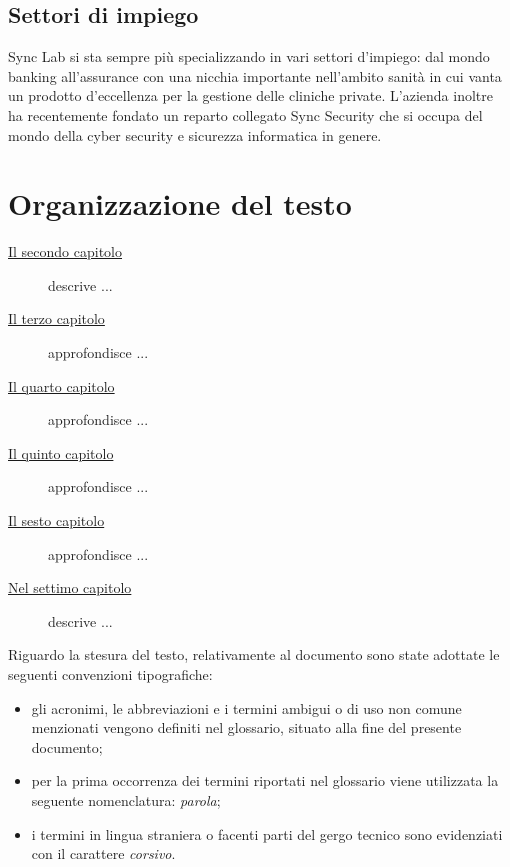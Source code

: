 \subsection{Settori di impiego}
Sync Lab si sta sempre più specializzando in vari settori d’impiego: dal mondo banking
all’assurance con una nicchia importante nell’ambito sanità in cui vanta un prodotto d’eccellenza
per la gestione delle cliniche private. L’azienda inoltre ha recentemente fondato un
reparto collegato Sync Security che si occupa del mondo della cyber security e
sicurezza informatica in genere.

\section{Organizzazione del testo}

\begin{description}
    \item[{\hyperref[cap:processi-metodologie]{Il secondo capitolo}}] descrive ...
    
    \item[{\hyperref[cap:descrizione-stage]{Il terzo capitolo}}] approfondisce ...
    
    \item[{\hyperref[cap:analisi-requisiti]{Il quarto capitolo}}] approfondisce ...
    
    \item[{\hyperref[cap:progettazione-codifica]{Il quinto capitolo}}] approfondisce ...
    
    \item[{\hyperref[cap:verifica-validazione]{Il sesto capitolo}}] approfondisce ...
    
    \item[{\hyperref[cap:conclusioni]{Nel settimo capitolo}}] descrive ...
\end{description}

Riguardo la stesura del testo, relativamente al documento sono state adottate le seguenti convenzioni tipografiche:
\begin{itemize}
	\item gli acronimi, le abbreviazioni e i termini ambigui o di uso non comune menzionati vengono definiti nel glossario, situato alla fine del presente documento;
	\item per la prima occorrenza dei termini riportati nel glossario viene utilizzata la seguente nomenclatura: \emph{parola}\glsfirstoccur;
	\item i termini in lingua straniera o facenti parti del gergo tecnico sono evidenziati con il carattere \emph{corsivo}.
\end{itemize}